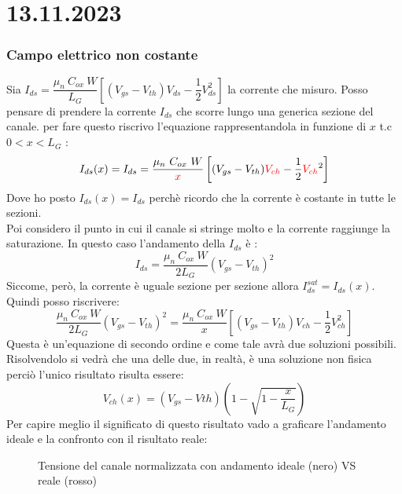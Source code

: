 \section*{13.11.2023}
\subsubsection{Campo elettrico non costante}
Sia  $I_{ds}=\dfrac{\mu_n\ C_{ox}\ W}{L_G}\left[ (V_{gs}-V_{th})V_{ds}-\dfrac{1}{2}V_{ds}^2\right]$ la corrente che misuro. Posso pensare di prendere la corrente $I_{ds}$ che scorre lungo una generica sezione del canale. per fare questo riscrivo l'equazione rappresentandola in funzione di $x$ t.c $0<x<L_G$ :
%
\begin{equation}
    I_{ds}(x)=I_{ds}=\dfrac{\mu_n\ C_{ox}\ W}{\textcolor{red}{x}}\left[ (V_{gs}-V_{th})\textcolor{red}{V_{ch}}-\dfrac{1}{2}\textcolor{red}{V_{ch}}^2\right]
\end{equation}
%
Dove ho posto $ I_{ds}(x)=I_{ds}$ perchè ricordo che la corrente è costante in tutte le sezioni.\\
Poi considero il punto in cui il canale si stringe molto e la corrente raggiunge la saturazione. In questo caso l'andamento della $I_{ds}$ è :
%
\begin{equation}
    I_{ds}=\dfrac{\mu_n\ C_{ox}\ W}{2L_G}(V_{gs}-V_{th})^2
\end{equation}
%
Siccome, però, la corrente è uguale sezione per sezione allora $I_{ds}^{sat}=I_{ds}(x)$. Quindi posso riscrivere:
%
\begin{equation}
    \dfrac{\mu_n\ C_{ox}\ W}{2L_G}(V_{gs}-V_{th})^2=\dfrac{\mu_n\ C_{ox}\ W}{x}\left[ (V_{gs}-V_{th})V_{ch}-\dfrac{1}{2}V_{ch}^2\right]
\end{equation}
%
Questa è un'equazione di secondo ordine e come tale avrà due soluzioni possibili. Risolvendolo si vedrà che una delle due, in realtà, è una soluzione non fisica perciò l'unico risultato risulta essere:
%
\begin{equation}
    V_{ch}(x)=(V_{gs}-V{th})\left( 1-\sqrt{1-\dfrac{x}{L_G}}\right)
\end{equation}
%
Per capire meglio il significato di questo risultato vado a graficare l'andamento ideale e la confronto con il risultato reale:
%
\begin{figure}[hbt!]
    \centering
    \caption{Tensione del canale normalizzata con andamento ideale (nero) VS reale (rosso)}
    \label{fig:enter-label}
\end{figure}
